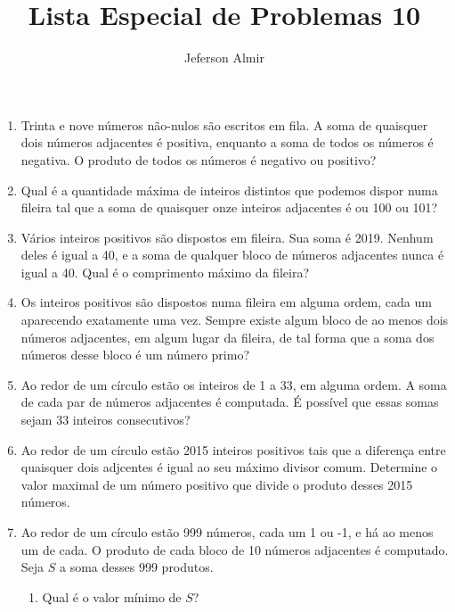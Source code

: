 \documentclass{article}
\title{Lista Especial de Problemas 10}
\author{Jeferson Almir}
\date{}
\begin{document}
\maketitle

\begin{enumerate}
    \item Trinta e nove números não-nulos são escritos em fila.
    A soma de quaisquer dois números adjacentes é positiva,
    enquanto a soma de todos os números é negativa.
    O produto de todos os números é negativo ou positivo?
    
    \item Qual é a quantidade máxima de inteiros distintos que podemos dispor numa fileira
    tal que a soma de quaisquer onze inteiros adjacentes é ou 100 ou 101?
    
    \item Vários inteiros positivos são dispostos em fileira.
    Sua soma é 2019.
    Nenhum deles é igual a 40,
    e a soma de qualquer bloco de números adjacentes nunca é igual a 40.
    Qual é o comprimento máximo da fileira?
    
    \item Os inteiros positivos são dispostos numa fileira em alguma ordem,
    cada um aparecendo exatamente uma vez.
    Sempre existe algum bloco de ao menos dois números adjacentes,
    em algum lugar da fileira,
    de tal forma que a soma dos números desse bloco é um número primo?
    
    \item Ao redor de um círculo estão os inteiros de 1 a 33,
    em alguma ordem.
    A soma de cada par de números adjacentes é computada.
    É possível que essas somas sejam 33 inteiros consecutivos?
    
    \item Ao redor de um círculo estão 2015 inteiros positivos
    tais que a diferença entre quaisquer dois adjcentes é igual
    ao seu máximo divisor comum.
    Determine o valor maximal de um número positivo que divide o produto desses 2015 números.
    
    \item Ao redor de um círculo estão 999 números,
    cada um 1 ou -1,
    e há ao menos um de cada.
    O produto de cada bloco de 10 números adjacentes é computado.
    Seja $S$ a soma desses 999 produtos.
    
    \begin{enumerate}
    \item Qual é o valor mínimo de $S$?
    

\end{enumerate}
\end{enumerate}
\end{document}
